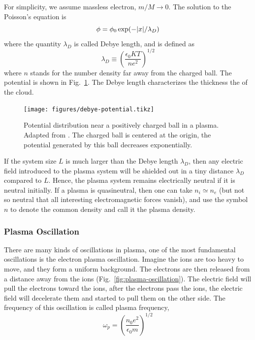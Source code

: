 For simplicity, we assume massless electron, $m/M \to 0$. The solution to the Poisson's equation is
\begin{equation}
	\phi = \phi_0\exp(-\abs{x}/\lambda_D)
\end{equation}
where the quantity $\lambda_D$ is called Debye length, and is defined as
\begin{equation}
	\lambda_D \equiv \left(\frac{\epsilon_0 KT}{ne^2}\right)^{1/2}
	\label{eq:debye-length}
\end{equation}
where $n$ stands for the number density far away from the charged ball. The potential is shown in Fig.~\ref{fig:debye-potential}. The  Debye length characterizes the thickness the of the cloud.

\begin{figure}[htbp]
	\centering
	\texttt{[image: figures/debye-potential.tikz]}
	\caption{Potential distribution near a positively charged ball in a plasma. Adapted from \cite{chen_introduction_2016}. The charged ball is centered at the origin, the potential generated by this ball decreases exponentially.}
	\label{fig:debye-potential}
\end{figure}

If the system size $L$ is much larger than the Debye length $\lambda_D$, then any electric field introduced to the plasma system will be shielded out in a tiny distance $\lambda_D$ compared to $L$. Hence, the plasma system remains electrically neutral if it is neutral initially. If a plasma is quasineutral, then one can take $n_i\simeq n_e$ (but not so neutral that all interesting electromagnetic forces vanish), and use the symbol $n$ to denote the common density and call it the plasma density.

\subsubsection*{Plasma Oscillation}
There are many kinds of oscillations in plasma, one of the most fundamental oscillations is the electron plasma oscillation. Imagine the ions are too heavy to move, and they form a uniform background. The electrons are then released from a distance away from the ions (Fig.~\ref{fig:plasma-oscillation}). The electric field will pull the electrons toward the ions, after the electrons pass the ions, the electric field will decelerate them and started to pull them on the other side. The frequency of this oscillation is called plasma frequency,
\begin{equation}
	\omega_p = \left(\frac{n_0e^2}{\epsilon_0m}\right)^{1/2}
\end{equation}

